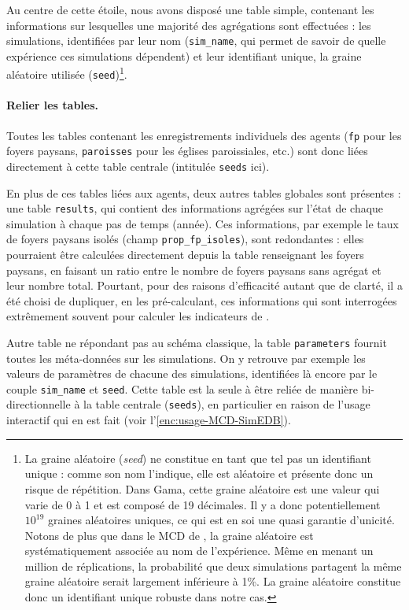 Au centre de cette étoile, nous avons disposé une table simple, contenant les informations sur lesquelles une majorité des agrégations sont effectuées : les simulations, identifiées par leur nom (\texttt{sim\_name}, qui permet de savoir de quelle expérience ces simulations dépendent) et leur identifiant unique, la graine aléatoire utilisée (\texttt{seed})\footnote{
	La graine aléatoire (\textit{seed}) ne constitue en tant que tel pas un identifiant unique : comme son nom l'indique, elle est aléatoire et présente donc un risque de répétition.
	Dans Gama, cette graine aléatoire est une valeur qui varie de 0 à 1 et est composé de 19 décimales.
	Il y a donc potentiellement $10^{19}$ graines aléatoires uniques, ce qui est en soi une quasi garantie d'unicité.
	Notons de plus que dans le MCD de \simedb{}, la graine aléatoire est systématiquement associée au nom de l'expérience.
	Même en menant un million de réplications, la probabilité que deux simulations partagent la même graine aléatoire serait largement inférieure à 1\%.
	La graine aléatoire constitue donc un identifiant unique robuste dans notre cas.
}.

\paragraph{Relier les tables.}

Toutes les tables contenant les enregistrements individuels des agents (\texttt{fp} pour les foyers paysans, \texttt{paroisses} pour les églises paroissiales, etc.) sont donc liées directement à cette table centrale (intitulée \texttt{seeds} ici).

En plus de ces tables liées aux agents, deux autres tables \og globales\fg{} sont présentes : une table \og \texttt{results}\fg{}, qui contient des informations agrégées sur l'état de chaque simulation à chaque pas de temps (année).
Ces informations, par exemple le taux de foyers paysans isolés (champ \og \texttt{prop\_fp\_isoles}\fg{}), sont redondantes : elles pourraient être calculées directement depuis la table renseignant les foyers paysans, en faisant un ratio entre le nombre de foyers paysans sans agrégat et leur nombre total.
Pourtant, pour des raisons d'efficacité autant que de clarté, il a été choisi de dupliquer, en les pré-calculant, ces informations qui sont interrogées extrêmement souvent pour calculer les indicateurs de \simfeodal{}.

Autre table ne répondant pas au schéma classique, la table \og \texttt{parameters}\fg{} fournit toutes les méta-données sur les simulations.
On y retrouve par exemple les valeurs de paramètres de chacune des simulations, identifiées là encore par le couple \texttt{sim\_name} et \texttt{seed}.
Cette table est la seule à être reliée de manière bi-directionnelle à la table centrale (\texttt{seeds}), en particulier en raison de l'usage interactif qui en est fait (voir l'\cref{enc:usage-MCD-SimEDB}).

